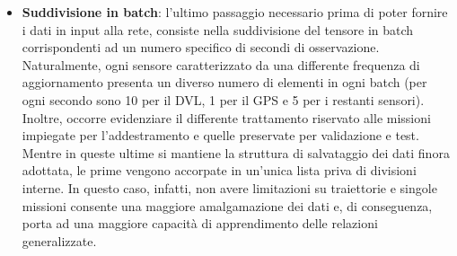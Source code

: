 \begin{itemize}
    I dati, tipicamente, sono caratterizzati da unità di grandezza molto differenti, cosa che può rendere complesso il processo di apprendimento di una rete neurale. Per ovviare a questa problematica, è necessario effettuare una normalizzazione dei dati, che, nello specifico, comporta il calcolo della media ($\mu$) e della deviazione standard ($\sigma$) di ogni grandezza misurata. Particolare attenzione va riservata alle missioni di test e di validazione. Introdurre i relativi dati nel processo, rischierebbe di fornire al modello informazioni su di esse, falsando la valutazione della capacità di generalizzazione della rete. Pertanto, il calcolo per ogni grandezza è effettuato su dati opportunamente filtrati e successivamente aggregati in vettori. Considerando una generica misurazione di un sensore ($X_{i}$), la normalizzazione passa per la seguente formulazione matematica:
    
        \begin{equation}
            \begin{cases}
                \mu (X) = \displaystyle \frac{\sum^{N}_{i=1} X_{i}}{N} \\[0.35cm]
                \sigma (X) = \displaystyle \sqrt{\frac{1}{N} \, \sum^{N}_{i=1} \left(X_{i} - \mu (X)\right)^{2}}
            \end{cases} \implies
            X_{\text{norm}} = \displaystyle \frac{X - \mu (X)}{\sigma (X)}
            \label{eq:normalization}
        \end{equation}

    \vspace{4pt}
    
    \item \textbf{Suddivisione in batch}: l'ultimo passaggio necessario prima di poter fornire i dati in input alla rete, consiste nella suddivisione del tensore in batch corrispondenti ad un numero specifico di secondi di osservazione. Naturalmente, ogni sensore caratterizzato da una differente frequenza di aggiornamento presenta un diverso numero di elementi in ogni batch (per ogni secondo sono 10 per il DVL, 1 per il GPS e 5 per i restanti sensori). Inoltre, occorre evidenziare il differente trattamento riservato alle missioni impiegate per l'addestramento e quelle preservate per validazione e test. Mentre in queste ultime si mantiene la struttura di salvataggio dei dati finora adottata, le prime vengono accorpate in un'unica lista priva di divisioni interne. In questo caso, infatti, non avere limitazioni su traiettorie e singole missioni consente una maggiore amalgamazione dei dati e, di conseguenza, porta ad una maggiore capacità di apprendimento delle relazioni generalizzate. 
    
\end{itemize}

